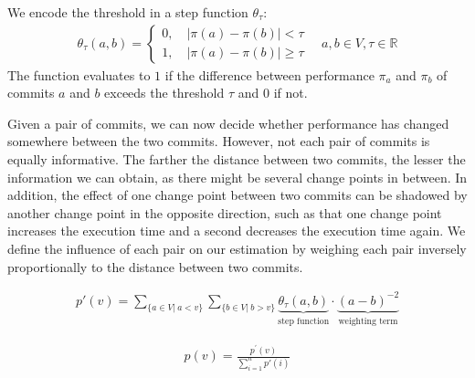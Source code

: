 \documentclass[sigconf]{acmart}
\begin{document}
	We encode the threshold in a step function $\theta_\tau$:
	\begin{equation}\label{eq:theta}
	\begin{gathered}
	\theta_\tau(a, b) = \begin{cases}
	0,\quad \vert\pi(a) - \pi(b)\vert < \tau\\
	1,\quad \vert\pi(a) - \pi(b)\vert \geq \tau
	\end{cases}\quad a, b \in V, \tau \in \mathbb{R}
	\end{gathered}
	\end{equation}
	The function evaluates to $1$ if the difference between performance $\pi_a$ and $\pi_b$ of commits $a$ and $b$ exceeds the threshold $\tau$ and $0$ if not.
		
	Given a pair of commits, we can now decide whether performance has changed somewhere between the two commits.
	However, not each pair of commits is equally informative.
	The farther the distance between two commits, the lesser the information we can obtain, as there might be several change points in between. 
	In addition, the effect of one change point between two commits can be shadowed by another change point in the opposite direction, such as that one change point increases the execution time and a second decreases the execution time again.
	We define the influence of each pair on our estimation by weighing each pair inversely proportionally to the distance between two commits.
	
	\begin{equation}\label{eq:cpp}
	\begin{gathered}
	p'(v) = \sum_{\lbrace a \in V \vert~ a < v\rbrace} \sum_{\lbrace b \in V \vert~ b > v\rbrace} \underbrace{\theta_\tau(a, b)}_{\text{step function}} \cdot \underbrace{(a-b)^{-2}}_{\text{weighting term}}
	\end{gathered}
	\end{equation}
	
	\begin{equation}\label{eq:normalize}
	\begin{gathered}
	p(v) = \frac{p^\prime(v)}{\sum_{i=1}^{n} p'(i)}
	\end{gathered}
	\end{equation}
	
\end{document}
